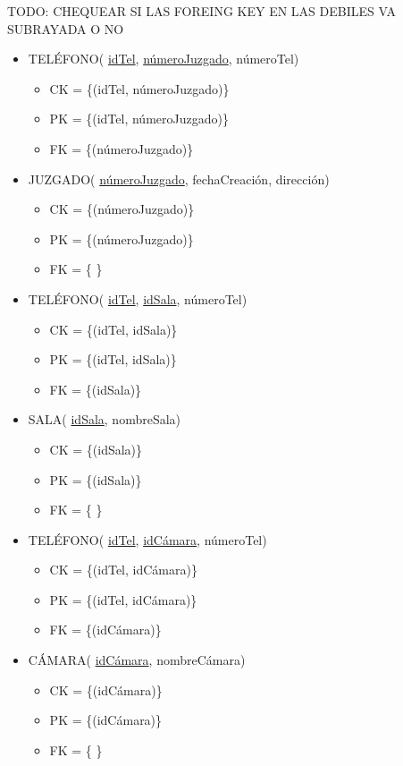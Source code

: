 TODO: CHEQUEAR SI LAS FOREING KEY EN LAS DEBILES VA SUBRAYADA O NO \\
\begin{itemize}

\item TELÉFONO( \underline{idTel}, \underline{númeroJuzgado}, númeroTel) 
	\begin{itemize}
		\item CK = \{(idTel, númeroJuzgado)\}
		\item PK = \{(idTel, númeroJuzgado)\}
		\item FK = \{(númeroJuzgado)\}
	\end{itemize}
	
\item JUZGADO( \underline{númeroJuzgado}, fechaCreación, dirección)
	\begin{itemize}
		\item CK = \{(númeroJuzgado)\}
		\item PK = \{(númeroJuzgado)\}
		\item FK = \{ \}
	\end{itemize}

\item TELÉFONO( \underline{idTel}, \underline{idSala}, númeroTel) 
	\begin{itemize}
		\item CK = \{(idTel, idSala)\}
		\item PK = \{(idTel, idSala)\}
		\item FK = \{(idSala)\}
	\end{itemize}
\item SALA( \underline{idSala}, nombreSala)
	\begin{itemize}
		\item CK = \{(idSala)\}
		\item PK = \{(idSala)\}
		\item FK = \{ \}
	\end{itemize}
	
\item TELÉFONO( \underline{idTel}, \underline{idCámara}, númeroTel) 
	\begin{itemize}
		\item CK = \{(idTel, idCámara)\}
		\item PK = \{(idTel, idCámara)\}
		\item FK = \{(idCámara)\}
	\end{itemize}
\item CÁMARA( \underline{idCámara}, nombreCámara)
	\begin{itemize}
		\item CK = \{(idCámara)\}
		\item PK = \{(idCámara)\}
		\item FK = \{ \}
	\end{itemize}
	

\end{itemize}
